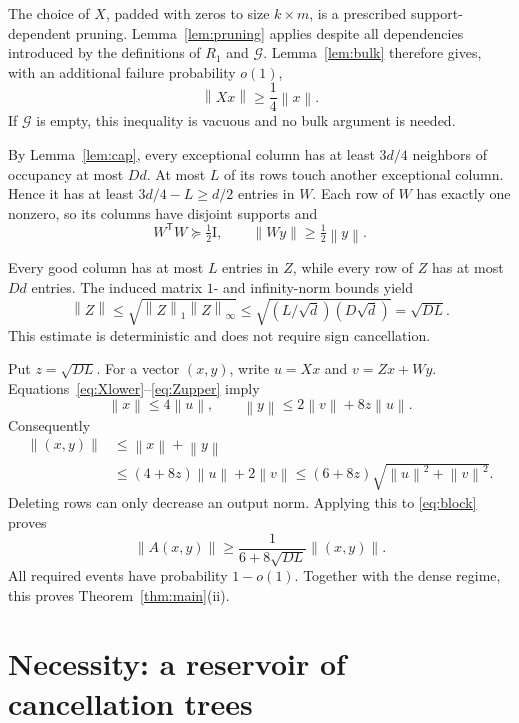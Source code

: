 \documentclass[11pt]{article}
\theoremstyle{definition}
\theoremstyle{remark}
\newcommand{\norm}[1]{\left\lVert #1\right\rVert}
\newcommand{\Id}{\mathrm I}
\newcommand{\calG}{\mathcal G}
\begin{document}
The choice of $X$, padded with zeros to size $k\times m$, is a prescribed support-dependent pruning. Lemma~\ref{lem:pruning} applies despite all dependencies introduced by the definitions of $R_1$ and $\calG$. Lemma~\ref{lem:bulk} therefore gives, with an additional failure probability $o(1)$,
\begin{equation}\label{eq:Xlower}
 \norm{Xx}\geq\frac14\norm{x}.
\end{equation}
If $\calG$ is empty, this inequality is vacuous and no bulk argument is needed.

By Lemma~\ref{lem:cap}, every exceptional column has at least $3d/4$ neighbors of occupancy at most $Dd$. At most $L$ of its rows touch another exceptional column. Hence it has at least $3d/4-L\geq d/2$ entries in $W$. Each row of $W$ has exactly one nonzero, so its columns have disjoint supports and
\begin{equation}\label{eq:Wlower}
 W^{\mathsf T}W\succeq\tfrac12\Id,
 \qquad \norm{Wy}\geq\tfrac12\norm{y}.
\end{equation}

Every good column has at most $L$ entries in $Z$, while every row of $Z$ has at most $Dd$ entries. The induced matrix $1$- and infinity-norm bounds yield
\begin{equation}\label{eq:Zupper}
 \norm Z\leq\sqrt{\norm Z_1\norm Z_\infty}
 \leq\sqrt{(L/\sqrt d)(D\sqrt d)}=\sqrt{DL}.
\end{equation}
This estimate is deterministic and does not require sign cancellation.

Put $z=\sqrt{DL}$. For a vector $(x,y)$, write $u=Xx$ and $v=Zx+Wy$. Equations~\eqref{eq:Xlower}--\eqref{eq:Zupper} imply
\[
 \norm{x}\leq4\norm{u},\qquad
 \norm{y}\leq2\norm{v}+8z\norm{u}.
\]
Consequently
\begin{align*}
 \norm{(x,y)}
 &\leq\norm{x}+\norm{y}\\
 &\leq(4+8z)\norm{u}+2\norm{v}
 \leq(6+8z)\sqrt{\norm{u}^2+\norm{v}^2}.
\end{align*}
Deleting rows can only decrease an output norm. Applying this to \eqref{eq:block} proves
\[
 \norm{A(x,y)}\geq\frac1{6+8\sqrt{DL}}\norm{(x,y)}.
\]
All required events have probability $1-o(1)$. Together with the dense regime, this proves Theorem~\ref{thm:main}(ii).

\section{Necessity: a reservoir of cancellation trees}\label{sec:necessity}
\end{document}
